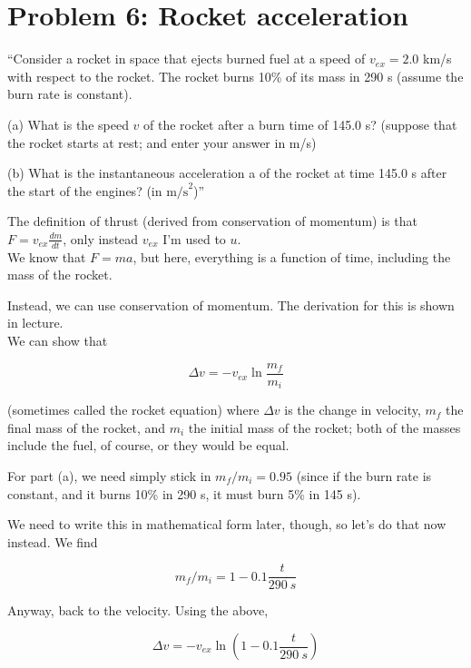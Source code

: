 \documentclass[8.01x]{subfiles}
\begin{document}
\section{Problem 6: Rocket acceleration}

``Consider a rocket in space that ejects burned fuel at a speed of $v_{ex} = 2.0$ km/s with respect to the rocket. The rocket burns 10\% of its mass in 290 s (assume the burn rate is constant).

(a) What is the speed $v$ of the rocket after a burn time of 145.0 s? (suppose that the rocket starts at rest; and enter your answer in m/s)

(b) What is the instantaneous acceleration a of the rocket at time 145.0 s after the start of the engines? (in $\text{m/s}^2$)''

The definition of thrust (derived from conservation of momentum) is that $F = v_{ex} \frac{dm}{dt}$, only instead $v_{ex}$ I'm used to $u$.\\
We know that $F = m a$, but here, everything is a function of time, including the mass of the rocket.

Instead, we can use conservation of momentum. The derivation for this is shown in lecture.\\
We can show that

\begin{equation}
\Delta v = - v_{ex} \ln \frac{m_f}{m_i}
\end{equation}

(sometimes called the rocket equation) where $\Delta v$ is the change in velocity, $m_f$ the final mass of the rocket, and $m_i$ the initial mass of the rocket; both of the masses include the fuel, of course, or they would be equal.

For part (a), we need simply stick in $m_f/m_i = 0.95$ (since if the burn rate is constant, and it burns 10\% in 290 s, it must burn 5\% in 145 s).

We need to write this in mathematical form later, though, so let's do that now instead. We find

\begin{equation}
m_f/m_i = 1 - 0.1 \frac{t}{\SI{290}{s}}
\end{equation}

Anyway, back to the velocity. Using the above,

\begin{equation}
\Delta v = - v_{ex} \ln \left(  1 - 0.1 \frac{t}{\SI{290}{s}} \right)
\end{equation}
\end{document}
